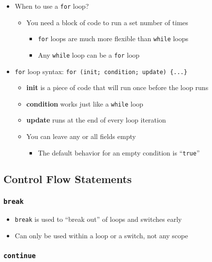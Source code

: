 \documentclass{article}
\begin{document}
\begin{itemize}
	\item When to use a \texttt{for} loop?
	\begin{itemize}
		\item You need a block of code to run a set number of times
		\begin{itemize}
			\item \texttt{for} loops are much more flexible than \texttt{while} loops
			\item Any \texttt{while} loop can be a \texttt{for} loop
		\end{itemize} 
	\end{itemize}
	\item \texttt{for} loop syntax: \texttt{for (init; condition; update) \{...\}} 
	\begin{itemize}
		\item \textbf{init} is a piece of code that will run once before the loop runs
		\item \textbf{condition} works just like a \texttt{while} loop
		\item \textbf{update} runs at the end of every loop iteration
		\item You can leave any or all fields empty \begin{itemize}
			\item The default behavior for an empty condition is ``\texttt{true}''
		\end{itemize}
	\end{itemize}
\end{itemize}

\subsection{Control Flow Statements}

\subsubsection{\texttt{break}}

\begin{itemize}
	\item \texttt{break} is used to ``break out'' of loops and switches early
	\item Can only be used within a loop or a switch, not any scope
\end{itemize}

\subsubsection{\texttt{continue}}
\end{document}
